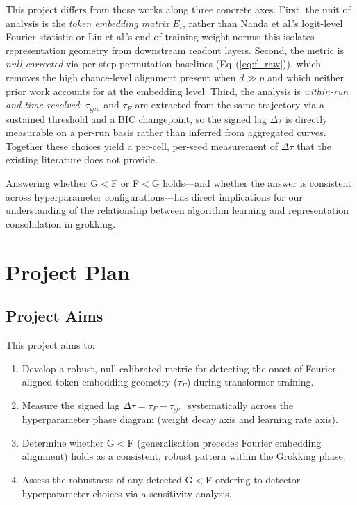 \documentclass[12pt,openany,a4paper]{book}
\newcommand{\eq}[1]  {Eq.\,(\ref{#1})}
\newcommand{\taug}{\tau_{\mathrm{gen}}}
\newcommand{\tauf}{\tau_{F}}
\newcommand{\Dtau}{\Delta\tau}
\begin{document}
This project differs from those works along three concrete axes.
First, the unit of analysis is the \emph{token embedding matrix} $E_t$,
rather than Nanda et al.'s logit-level Fourier statistic or Liu et al.'s
end-of-training weight norms; this isolates representation geometry
from downstream readout layers.
Second, the metric is \emph{null-corrected} via per-step permutation
baselines (\eq{eq:f_raw}), which removes the high chance-level
alignment present when $d \gg p$ and which neither prior work
accounts for at the embedding level.
Third, the analysis is \emph{within-run and time-resolved}: $\taug$
and $\tauf$ are extracted from the same trajectory via a sustained
threshold and a BIC changepoint, so the signed lag $\Dtau$ is
directly measurable on a per-run basis rather than inferred from
aggregated curves.
Together these choices yield a per-cell, per-seed measurement of
$\Dtau$ that the existing literature does not provide.

Answering whether G$<$F or F$<$G holds---and whether the answer is
consistent across hyperparameter configurations---has direct implications
for our understanding of the relationship between algorithm learning
and representation consolidation in grokking.

\chapter{Project Plan}
\label{chap:plan}

\section{Project Aims}

This project aims to:
\begin{enumerate}
  \item Develop a robust, null-calibrated metric for detecting the
    onset of Fourier-aligned token embedding geometry ($\tauf$) during
    transformer training.
  \item Measure the signed lag $\Dtau = \tauf - \taug$ systematically
    across the hyperparameter phase diagram (weight decay axis and
    learning rate axis).
  \item Determine whether G$<$F (generalisation precedes Fourier
    embedding alignment) holds as a consistent, robust pattern within
    the Grokking phase.
  \item Assess the robustness of any detected G$<$F ordering to
    detector hyperparameter choices via a sensitivity analysis.
\end{enumerate}
\end{document}
